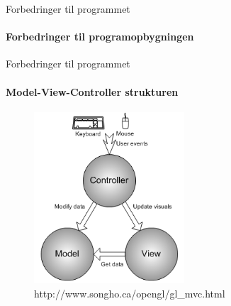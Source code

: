 \begin{frame}{Forbedringer til programmet}
\framesubtitle{Forbedringer til programopbygningen}
 

\end{frame}
\begin{frame}{Forbedringer til programmet}
\framesubtitle{Model-View-Controller strukturen}
\begin{center}
\begin{figure}
  \includegraphics[width=0.5\textwidth]{images/mvc.png}
  \caption{http://www.songho.ca/opengl/gl\_mvc.html}
\end{figure}
\end{center}

\end{frame}
